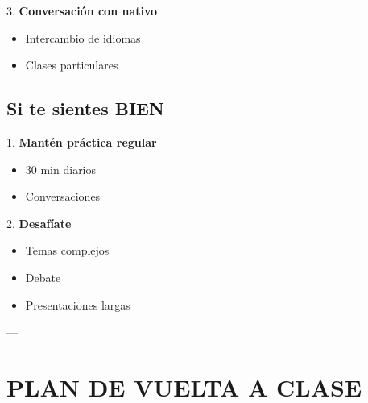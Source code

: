 \documentclass[a4paper,11pt]{article}
\begin{document}
\vspace{0.2cm}

3. \textbf{Conversación con nativo}

\begin{itemize}

  \item Intercambio de idiomas

  \item Clases particulares

\end{itemize}

\vspace{0.2cm}

\subsection{Si te sientes BIEN}

\vspace{0.2cm}

1. \textbf{Mantén práctica regular}

\begin{itemize}

  \item 30 min diarios

  \item Conversaciones

\end{itemize}

\vspace{0.2cm}

2. \textbf{Desafíate}

\begin{itemize}

  \item Temas complejos

  \item Debate

  \item Presentaciones largas

\end{itemize}

\vspace{0.2cm}

---

\vspace{0.2cm}

\section{PLAN DE VUELTA A CLASE}
\end{document}
